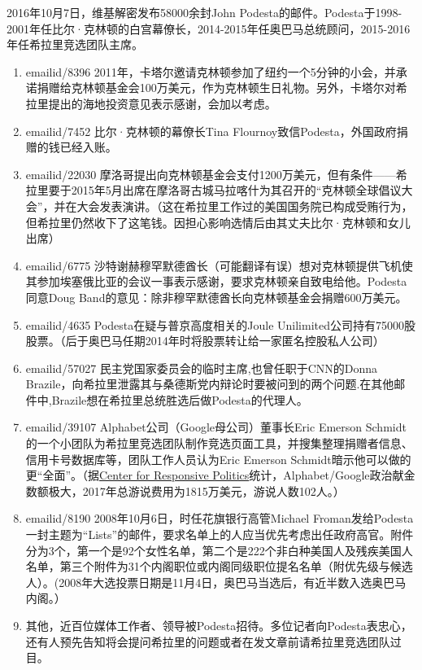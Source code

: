 2016年10月7日，维基解密发布58000余封John Podesta的邮件。Podesta于1998-2001年任比尔·克林顿的白宫幕僚长，2014-2015年任奥巴马总统顾问，2015-2016年任希拉里竞选团队主席。
\begin{enumerate}
\item emailid/8396 2011年，卡塔尔邀请克林顿参加了纽约一个5分钟的小会，并承诺捐赠给克林顿基金会100万美元，作为克林顿生日礼物。另外，卡塔尔对希拉里提出的海地投资意见表示感谢，会加以考虑。

  \item emailid/7452 比尔·克林顿的幕僚长Tina Flournoy致信Podesta，外国政府捐赠的钱已经入账。

  \item emailid/22030 摩洛哥提出向克林顿基金会支付1200万美元，但有条件——希拉里要于2015年5月出席在摩洛哥古城马拉喀什为其召开的“克林顿全球倡议大会”，并在大会发表演讲。（这在希拉里工作过的美国国务院已构成受贿行为，但希拉里仍然收下了这笔钱。因担心影响选情后由其丈夫比尔·克林顿和女儿出席）

  \item emailid/6775 沙特谢赫穆罕默德酋长（可能翻译有误）想对克林顿提供飞机使其参加埃塞俄比亚的会议一事表示感谢，要求克林顿亲自致电给他。Podesta同意Doug Band的意见：除非穆罕默德酋长向克林顿基金会捐赠600万美元。

  \item emailid/4635 Podesta在疑与普京高度相关的Joule Unilimited公司持有75000股股票。（后于奥巴马任期2014年时将股票转让给一家匿名控股私人公司）

  \item emailid/57027 民主党国家委员会的临时主席,也曾任职于CNN的Donna Brazile，向希拉里泄露其与桑德斯党内辩论时要被问到的两个问题.在其他邮件中,Brazile想在希拉里总统胜选后做Podesta的代理人。

\item emailid/39107 Alphabet公司（Google母公司）董事长Eric Emerson Schmidt的一个小团队为希拉里竞选团队制作竞选页面工具，并搜集整理捐赠者信息、信用卡号数据库等，团队工作人员认为Eric Emerson Schmidt暗示他可以做的更“全面”。（据\href{https://www.opensecrets.org/lobby/clientsum.php?id=D000067823&year=2017}{Center for Responsive Politics}统计，Alphabet/Google政治献金数额极大，2017年总游说费用为1815万美元，游说人数102人。）

\item emailid/8190 2008年10月6日，时任花旗银行高管Michael Froman发给Podesta一封主题为“Lists”的邮件，要求名单上的人应当优先考虑出任政府高官。附件分为3个，第一个是92个女性名单，第二个是222个非白种美国人及残疾美国人名单，第三个附件为31个内阁职位或内阁同级职位提名名单（附优先级与候选人）。(2008年大选投票日期是11月4日，奥巴马当选后，有近半数入选奥巴马内阁。）

  \item 其他，近百位媒体工作者、领导被Podesta招待。多位记者向Podesta表忠心，还有人预先告知将会提问希拉里的问题或者在发文章前请希拉里竞选团队过目。
\end{enumerate}


